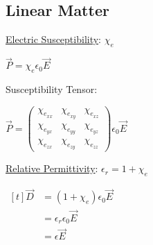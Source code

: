 \documentclass[12pt]{article}
\begin{document}
\newpage
\subsection{Linear Matter}
\hfill \break
\begin{minipage}[t]{0.48\textwidth}

	\underline{Electric Susceptibility}: \( \chi_e \)

	\vspace{10pt}
	\hspace{10pt} \hspace{10pt} \( \vec{ P } = \chi_e \epsilon_0 \vec{E} \)

	\vspace{20pt}
	Susceptibility Tensor: 
	
	\vspace{10pt}
	\hspace{10pt} \hspace{10pt} \( \vec{ P } = 
		\begin{pmatrix}
			\chi_{e_{xx}} & \chi_{e_{xy}} & \chi_{e_{xz}} \\
			\chi_{e_{yx}} & \chi_{e_{yy}} & \chi_{e_{yz}} \\
			\chi_{e_{zx}} & \chi_{e_{zy}} & \chi_{e_{zz}}
		\end{pmatrix}
		\epsilon_0 \vec{E} \)

	\vspace{20pt}
	\underline{Relative Permittivity}: \( \epsilon_r = 1 + \chi_e \)

	\vspace{10pt}
	\hspace{10pt} \( \begin{aligned}[t]
			\vec{D} &= ( 1 + \chi_e ) \epsilon_0 \vec{E} \\ 
			&= \epsilon_r \epsilon_0 \vec{E}\\
			&= \epsilon \vec{E}
	\end{aligned} \)


\end{minipage}
\end{document}
